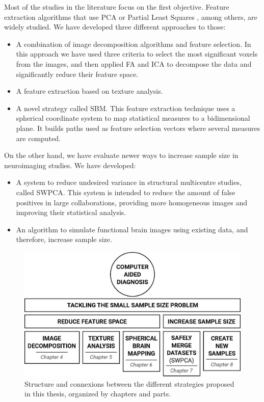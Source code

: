 Most of the studies in the literature focus on the first objective. Feature extraction algorithms that use \ac{PCA} \cite{Khedher2015,Towey2011} or Partial Least Squares \cite{Segovia2013}, among others, are widely studied. We have developed three different approaches to those:

\begin{itemize}
	\item A combination of image decomposition algorithms and feature selection. In this approach we have used three criteria to select the most significant voxels from the images, and then applied \acf{FA} and \acf{ICA} to decompose the data and significantly reduce their feature space. 
	\item A feature extraction based on texture analysis. 
	\item A novel strategy called \acf{SBM}. This feature extraction technique uses a spherical coordinate system to map statistical measures to a bidimensional plane. It builds paths used as feature selection vectors where several measures are computed. 
\end{itemize}

On the other hand, we have evaluate newer ways to increase sample size in neuroimaging studies. We have developed: 
 \begin{itemize}
 	\item A system to reduce undesired variance in structural multicentre studies, called \acf{SWPCA}. This system is intended to reduce the amount of false positives in large collaborations, providing more homogeneous images and improving their statistical analysis. 
 	\item An algorithm to simulate functional brain images using existing data, and therefore, increase sample size. 
 \end{itemize}

\begin{figure}
	\centering
	\includegraphics[width=0.7\linewidth]{Graphics/ch1/outline}
	\caption[Structure of the thesis.]{Structure and connexions between the different strategies proposed in this thesis, organized by chapters and parts.}
	\label{fig:outline}
\end{figure}


